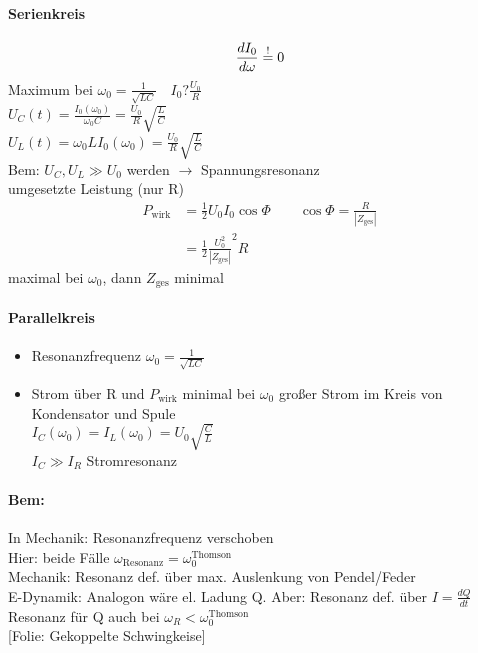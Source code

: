 \documentclass[titlepage,12pt,a4paper,ngerman]{report}
\newcommand{\tx}[1]{\textrm{#1}}
\newcommand{\folie}[1]{\color{gray}[Folie: #1]\color{black}}
\begin{document}
 \paragraph{Serienkreis}
 $$\frac{dI_0}{d\omega} \buildrel ! \over = 0 $$
 Maximum bei $ \omega_0 = \frac{1}{\sqrt{LC}} \quad I_0 ? \frac{U_0}{R} $\\
 $ U_C(t) = \frac{I_0(\omega_0)}{\omega_0 C} = \frac{U_0}{R} \sqrt{\frac{L}{C}} $\\
 $ U_L(t) = \omega_0 L I_0(\omega_0) = \frac{U_0}{R} \sqrt{\frac{L}{C}} $\\
 Bem: $ U_C,U_L \gg U_0 $ werden $ \rightarrow $ Spannungsresonanz\\[10pt]
 umgesetzte Leistung (nur R)\\
 \begin{align*}
 P_{\tx{wirk}} &= \frac{1}{2} U_0 I_0 \cos \Phi \qquad \cos \Phi = \frac{R}{|Z_{\tx{ges}}|}\\
 &= \frac{1}{2} \frac{U_0^2}{|Z_{\tx{ges}}|}^2 R
 \end{align*}
 maximal bei $ \omega_0 $, dann $ Z_{\tx{ges}} $ minimal
 \paragraph{Parallelkreis}
 \begin{itemize}
 	\item Resonanzfrequenz $ \omega_0 = \frac{1}{\sqrt{LC}} $
 	\item Strom über R und $ P_{\tx{wirk}} $ minimal bei $ \omega_0 $ großer Strom im Kreis von Kondensator und Spule\\
 	$ I_C(\omega_0) = I_L(\omega_0) = U_0 \sqrt{\frac{C}{L}} $\\
 	$ I_C \gg I_R $ Stromresonanz
 \end{itemize}
 \paragraph{Bem:} In Mechanik: Resonanzfrequenz verschoben\\
 Hier: beide Fälle $ \omega_{\tx{Resonanz}} = \omega_0^{\tx{Thomson}} $\\
 Mechanik: Resonanz def. über max. Auslenkung von Pendel/Feder\\
 E-Dynamik: Analogon wäre el. Ladung Q. Aber: Resonanz def. über $ I = \frac{dQ}{dt} $ Resonanz für Q auch bei $ \omega_R < \omega_0^{\tx{Thomson}} $\\
\folie{Gekoppelte Schwingkeise}
\end{document}
